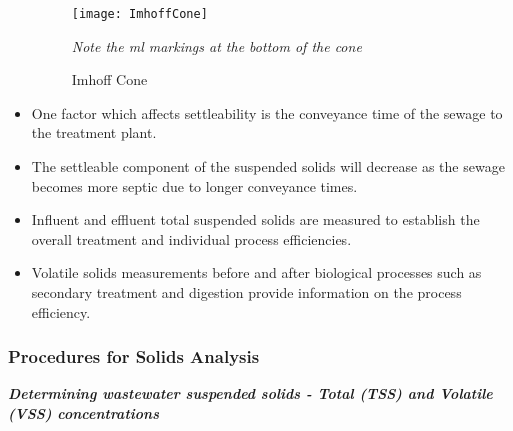 \begin{itemize}
\begin{itemize}
			      \end{itemize}	
%			      		
%			      		

 \begin{figure}[h!]
 \centering
        \texttt{[image: ImhoffCone]}
        \caption{Imhoff Cone}
       \textit{Note the ml markings at the bottom of the cone} 
 \end{figure}




			      	\item One factor which affects settleability is the conveyance time of the sewage to the treatment plant. 			
			      	\item The settleable component of the suspended solids will decrease as the sewage becomes more septic due to longer conveyance times.
			\item Influent and effluent total suspended solids are measured to establish the overall treatment and individual process efficiencies.  
			\item Volatile solids measurements before and after biological processes such as secondary treatment and digestion provide information on the process efficiency.\\
		\end{itemize}

\newpage
	\subsubsection{Procedures for Solids Analysis}
	\textbf{\textit{Determining wastewater suspended solids - Total (TSS) and Volatile (VSS) concentrations}}

